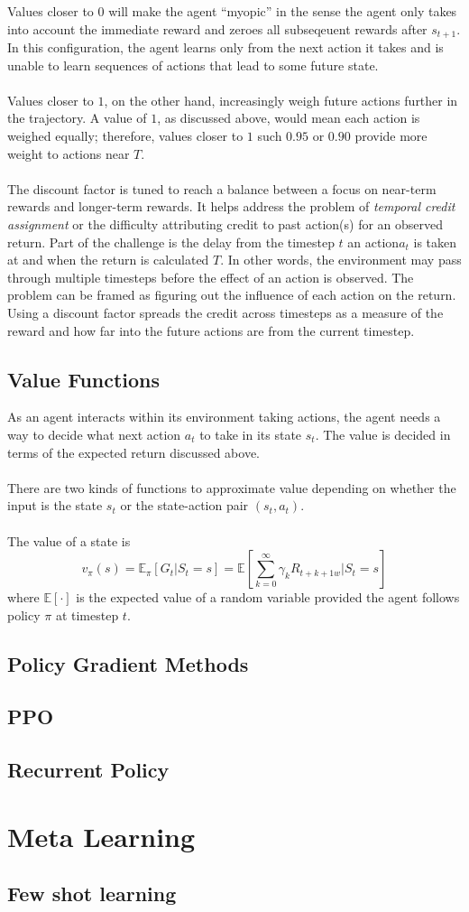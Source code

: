 Values closer to $0$ will make the agent ``myopic'' in the sense the agent only takes into
account the immediate reward and zeroes all subseqeuent rewards after $s_{t+1}$. 
In this configuration, the agent learns only from the next action it takes and is unable 
to learn sequences of actions that lead to some future state. 
\\\\
Values closer to $1$, on the other hand, increasingly weigh future actions further
in the trajectory. A value of $1$, as discussed above, would mean each action is weighed
equally; therefore, values closer to $1$ such $0.95 \text{ or } 0.90$ provide more weight to 
actions near $T$.
\\\\
The discount factor is tuned to reach a balance between a focus on near-term rewards and 
longer-term rewards. It helps address the problem of \textit{temporal credit assignment} 
or the difficulty attributing credit to past action(s) for an observed return. 
Part of the challenge is the delay from the timestep $t$ an action$a_t$ is taken at and 
when the return is calculated $T$. 
In other words, the environment may pass through multiple timesteps before the effect of 
an action is observed.
The problem can be framed as figuring out the influence of each action on the return. 
Using a discount factor spreads the credit across timesteps as a measure of the reward and
how far into the future actions are from the current timestep.
\subsection{Value Functions}
As an agent interacts within its environment taking actions, the agent needs a way to
decide what next action $a_t$ to take in its state $s_t$. The value is decided in 
terms of the expected return discussed above. 
\\\\
There are two kinds of functions to approximate value depending on whether the input
is the state $s_t$ or the state-action pair $(s_t, a_t)$. 
\\\\
The value of a state is 
\begin{equation}
    v_{\pi}(s) = \mathbb{E}_{\pi}[G_{t}|S_{t}=s] = \mathbb{E} \left[ \sum_{k=0}^{\infty} \gamma_{k}R_{t+k+1w}|S_{t}=s \right]
\end{equation} where $\mathbb{E}\left[ \cdot \right]$ is the expected value of a random variable 
provided the agent follows policy $\pi$ at timestep $t$.

\subsection{Policy Gradient Methods}
\subsection{PPO}
\subsection{Recurrent Policy}
\section{Meta Learning}
\subsection{Few shot learning}
